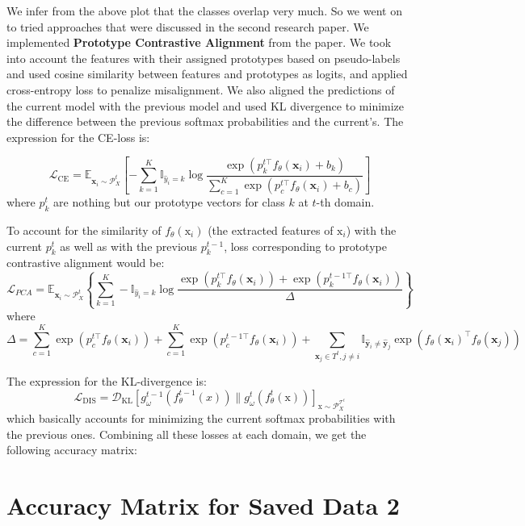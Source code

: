 \documentclass{article} %
\begin{document}
We infer from the above plot that the classes overlap very much. So we went on to tried approaches that were discussed in the second research paper. We implemented \textbf{Prototype Contrastive Alignment} from the paper. We took into account the features with their assigned prototypes based on pseudo-labels and used cosine similarity between features and prototypes as logits, and applied cross-entropy loss to penalize misalignment. We also aligned the predictions of the current model with the previous model and used KL divergence to minimize the difference between the previous softmax probabilities and the current's. The expression for the CE-loss is: 

$$\mathcal{L}_{\text{CE}} = \mathbb{E}_{\textbf{x}_i \sim \mathcal{P}_X^t} \left[ - \sum_{k=1}^K \mathbb{I}_{\hat{y}_i = k} \log \frac{\exp \left( p_k^{t \top} f_\theta(\textbf{x}_i) + b_k \right)}{\sum_{c=1}^K \exp \left( p_c^{t \top} f_\theta(\textbf{x}_i) + b_c \right)} \right]$$
where $p_k^t$ are nothing but our prototype vectors for class $k$ at $t$-th domain. 

To account for the similarity of $f_\theta(\text{x}_i)$ (the extracted features of $\text{x}_i$) with the current $p_k^t$ as well as with the previous $p_k^{t - 1}$, loss corresponding to prototype contrastive alignment would be: 
\[\mathcal{L}_{PCA} = \mathbb{E}_{\textbf{x}_i \sim \mathcal{P}_X^t} \left\{\sum_{k=1}^K -\mathbb{I}_{\hat{y}_i = k} \log \frac{\exp \left( p_k^{t \top} f_\theta(\textbf{x}_i) \right) + \exp \left( p_k^{t-1 \top} f_\theta(\textbf{x}_i) \right)}{\Delta}\right \}
\]
where 
$$ \Delta = \sum_{c=1}^K \exp \left( p_c^{t \top} f_\theta(\textbf{x}_i) \right) + \sum_{c=1}^K \exp \left( p_c^{t-1 \top} f_\theta(\textbf{x}_i) \right) +\sum_{\textbf{x}_j \in T^t, j \neq i} \mathbb{I}_{\hat{\textbf{y}}_i \neq \hat{\textbf{y}}_j} \exp \left( f_\theta(\textbf{x}_i)^{\top} f_\theta(\textbf{x}_j) \right) $$

The expression for the KL-divergence is: 
$$\mathcal{L}_{\text{DIS}} = \mathcal{D}_{\text{KL}} [g_\omega^{t-1} (f_\theta^{t-1} (x)) \| g_\omega^t (f_\theta^t(\text{x}))]_{\text{x} \sim \mathcal{P}_X^{\mathcal{T}^t}}$$
which basically accounts for minimizing the current softmax probabilities with the previous ones. Combining all these losses at each domain, we get the following accuracy matrix: 
\section*{Accuracy Matrix for Saved Data 2}
\end{document}
